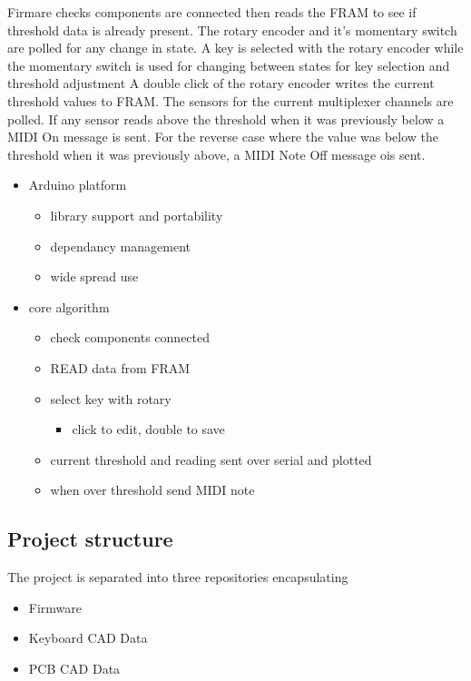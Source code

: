 Firmare checks components are connected then reads the FRAM to see if
threshold data is already present. The rotary encoder and it's momentary
switch are polled for any change in state. A key is selected with the
rotary encoder while the momentary switch is used for changing between
states for key selection and threshold adjustment A double click of the
rotary encoder writes the current threshold values to FRAM. The sensors
for the current multiplexer channels are polled. If any sensor reads
above the threshold when it was previously below a MIDI On message is
sent. For the reverse case where the value was below the threshold when
it was previously above, a MIDI Note Off message ois sent.

\begin{itemize}
\item
  Arduino platform

  \begin{itemize}
  \item
    library support and portability
  \item
    dependancy management
  \item
    wide spread use
  \end{itemize}
\item
  core algorithm

  \begin{itemize}
  \item
    check components connected
  \item
    READ data from FRAM
  \item
    select key with rotary

    \begin{itemize}
    \item
      click to edit, double to save
    \end{itemize}
  \item
    current threshold and reading sent over serial and plotted
  \item
    when over threshold send MIDI note
  \end{itemize}
\end{itemize}

\subsection{Project structure}\label{project-structure}

The project is separated into three repositories encapsulating

\begin{itemize}
\item
  Firmware
\item
  Keyboard CAD Data
\item
  PCB CAD Data
\end{itemize}

